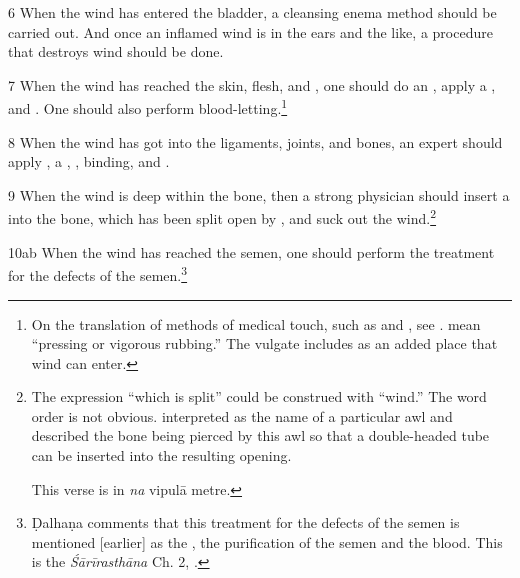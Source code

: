 \begin{translation}
    \item [6] When the wind has entered the bladder, a cleansing enema method
should be carried out. And once an inflamed wind is in the ears and the like,
a procedure that destroys wind should be done.

    \item [7]
    When the wind has reached the skin, flesh, and , one should do 
    an 
    , apply a ,  
     and . One should also 
    perform blood-letting.\footnote{On the translation of methods of 
    medical touch, such as  and , see 
    \cite[122--131]{broo-2021}.   mean “pressing or 
    vigorous rubbing.”  The vulgate includes 
     as an added place that wind can enter.}

    \item[8]
    When the wind has got into the ligaments, joints, and bones, an expert 
    should apply  ,  a ,
    , binding, and .



    \item [9] When the wind is deep within the bone, then a strong physician
should insert a  into the bone, which has been split open by
, and suck out the wind.\footnote{The
    expression “which is split” could be construed with “wind.”  The word order
    is not obvious.   interpreted  as the
    name of a particular awl and described the bone being pierced by this awl so
    that a double-headed tube can be inserted into the resulting opening.
    
    This verse is in \emph{na} vipulā metre.}
         
         
          

    \item[10ab]
    When the wind has reached the semen, one should perform the treatment 
    for the defects of the semen.\footnote{Ḍalhaṇa comments 
    \citep[421]{vulgate} that this treatment for the defects of the semen is 
    mentioned [earlier] as the , the purification of the 
    semen and the blood. This is the \emph{Śārīrasthāna} Ch. 2, 
    .}
    

\end{translation}
